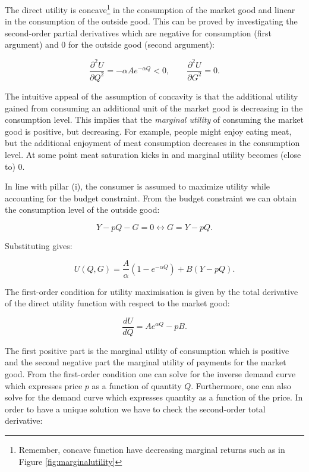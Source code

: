 \documentclass[
]{book}
\begin{document}
The direct utility is concave\footnote{Remember, concave function have decreasing marginal returns such as in Figure \ref{fig:marginalutility}} in the consumption of the market good and linear in the consumption of the outside good. This can be proved by investigating the second-order partial derivatives which are negative for consumption (first argument) and 0 for the outside good (second argument):

\begin{equation}
\frac{\partial^2 U}{\partial Q^2} = - \alpha Ae^{-\alpha Q} < 0, \qquad \frac{\partial^2 U}{\partial G^2} = 0.
\end{equation}

The intuitive appeal of the assumption of concavity is that the additional utility gained from consuming an additional unit of the market good is decreasing in the consumption level. This implies that the \emph{marginal utility} of consuming the market good is positive, but decreasing. For example, people might enjoy eating meat, but the additional enjoyment of meat consumption decreases in the consumption level. At some point meat saturation kicks in and marginal utility becomes (close to) 0.

In line with pillar (i), the consumer is assumed to maximize utility while accounting for the budget constraint. From the budget constraint we can obtain the consumption level of the outside good:

\begin{equation}
Y - pQ - G = 0 \longleftrightarrow G= Y - pQ.
\end{equation}

Substituting gives:

\begin{equation}
U(Q,G)=\frac{A}{\alpha}(1-e^{-\alpha Q})+B(Y - p Q).
\end{equation}

The first-order condition for utility maximisation is given by the total derivative of the direct utility function with respect to the market good:

\begin{equation}
\frac{dU}{dQ} = Ae^{\alpha Q} - pB.
\label{eq:foc}
\end{equation}

The first positive part is the marginal utility of consumption which is positive and the second negative part the marginal utility of payments for the market good. From the first-order condition one can solve for the inverse demand curve which expresses price \(p\) as a function of quantity \(Q\). Furthermore, one can also solve for the demand curve which expresses quantity as a function of the price. In order to have a unique solution we have to check the second-order total derivative:
\end{document}
